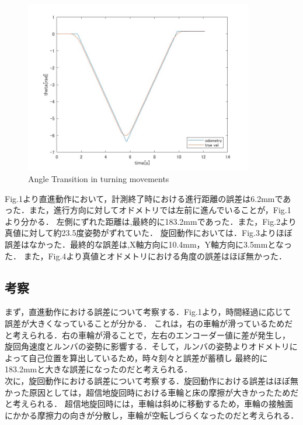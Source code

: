 \documentclass[a4paper,11pt]{jsarticle}
\begin{document}
\begin{figure}[H]\centering
\includegraphics[width=100mm]{fig_4.jpg}
\caption{Angle Transition in turning movements}
\label{fig:5}\vspace{0zh}\end{figure}



Fig.1より直進動作において，計測終了時における進行距離の誤差は6.2mmであった．また，進行方向に対してオドメトリでは左前に進んでいることが，Fig.1より分かる．
左側にずれた距離は,最終的に183.2mmであった．また，Fig.2より真値に対して約23.5度姿勢がずれていた．
旋回動作においては．Fig.3よりほぼ誤差はなかった．最終的な誤差は,X軸方向に10.4mm，Y軸方向に3.5mmとなった．
また，Fig.4より真値とオドメトリにおける角度の誤差はほぼ無かった．

\newpage

\subsection{考察}
まず，直進動作における誤差について考察する．Fig.1より，時間経過に応じて誤差が大きくなっていることが分かる．
これは，右の車輪が滑っているためだと考えられる．右の車輪が滑ることで，左右のエンコーダー値に差が発生し，
旋回角速度とルンバの姿勢に影響する．そして，ルンバの姿勢よりオドメトリによって自己位置を算出しているため，時々刻々と誤差が蓄積し
最終的に183.2mmと大きな誤差になったのだと考えられる．\\
次に，旋回動作における誤差について考察する．旋回動作における誤差はほぼ無かった原因としては，超信地旋回時における車輪と床の摩擦が大きかったためだと考えられる．
超信地旋回時には，車輪は斜めに移動するため，車輪の接触面にかかる摩擦力の向きが分散し，車輪が空転しづらくなったのだと考えられる．
\end{document}

